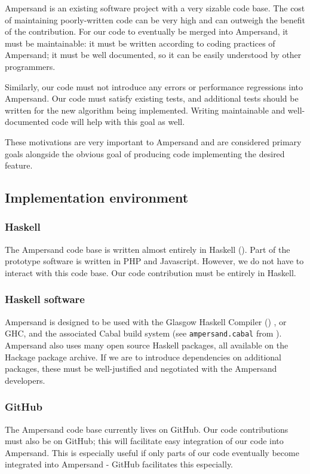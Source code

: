 \documentclass[12pt]{report}
\begin{document}
Ampersand is an existing software project with a very sizable code base. The
cost of maintaining poorly-written code can be very high and can outweigh the
benefit of the contribution. For our code to eventually be merged into
Ampersand, it must be maintainable: it must be written according to coding
practices of Ampersand; it must be well documented, so it can be easily
understood by other programmers. 

Similarly, our code must not introduce any errors or performance regressions
into Ampersand. Our code must satisfy existing tests, and additional tests should
be written for the new algorithm being implemented. Writing maintainable and
well-documented code will help with this goal as well.

These motivations are very important to Ampersand and are considered primary
goals alongside the obvious goal of producing code implementing the desired
feature.

\subsection{Implementation environment}
\subsubsection*{Haskell}
The Ampersand code base is written almost entirely in Haskell (\cite{ampSource}). Part of the
prototype software is written in PHP and Javascript. 
However, we do not have to interact with this code base. Our code contribution
must be entirely in Haskell.

\subsubsection*{Haskell software}
Ampersand is designed to be used with the Glasgow Haskell Compiler (\cite{GHC}) , or GHC,
and the associated Cabal build system (see \verb|ampersand.cabal| from \cite{ampSource}). 
Ampersand also uses many open source Haskell packages, all available on the
Hackage package archive. 
If we are to introduce dependencies on additional packages,
  these must be well-justified and negotiated with the Ampersand developers.


\subsubsection*{GitHub}
The Ampersand code base currently lives on GitHub. Our code contributions must
also be on GitHub; this will facilitate easy integration of our code into
Ampersand. This is especially useful if only parts of our code eventually become
integrated into Ampersand - GitHub facilitates this especially. 
%
\end{document}
